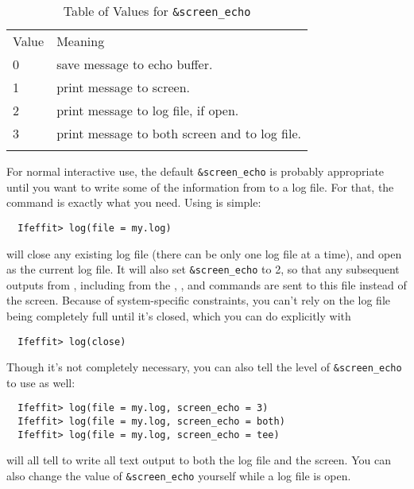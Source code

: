 \begin{table}
 \begin{center}
  \caption[a]{Table of Values for {\tt{\&screen\_echo}}
  {\label{Table:ScreenEcho}} }
  \begin{tabular}{ll}
    Value & Meaning \\
    \noalign{\smallskip} \hline   \noalign{\smallskip}
    0   & save message to echo buffer.\\
    1   & print message to screen. \\
    2   & print message to log file, if open.\\
    3   & print message to both screen and to log file. \\
    \noalign{\smallskip}   \hline
  \end{tabular}
 \end{center}
\end{table}
\noindent
{ }
For normal interactive use, the default {\tt{\&screen\_echo}} is probably
appropriate until you want to write some of the information from {\ifeffit}
to a log file.  For that, the {} command is exactly what you
need.  Using {} is simple:
\begin{verbatim}
  Ifeffit> log(file = my.log)
\end{verbatim}
\noindent
will close any existing log file (there can be only one log file at a
time), and open {} as the current log file. It will also set
{\tt{\&screen\_echo}} to 2, so that any subsequent outputs from {\ifeffit},
including from the {}, {}, and {} commands are
sent to this file instead of the screen.  Because of system-specific
constraints, you can't rely on the log file being completely full until
it's closed, which you can do explicitly with
\begin{verbatim}
  Ifeffit> log(close)
\end{verbatim}
\noindent
Though it's not completely necessary, you can also tell {}  the
level of {\tt{\&screen\_echo}} to use as well:
\begin{verbatim}
  Ifeffit> log(file = my.log, screen_echo = 3)
  Ifeffit> log(file = my.log, screen_echo = both)
  Ifeffit> log(file = my.log, screen_echo = tee)
\end{verbatim}
\noindent
will all tell {} to write all text output to both the log file
and the screen.  You can also change the value of {\tt{\&screen\_echo}}
yourself while a log file is open.


